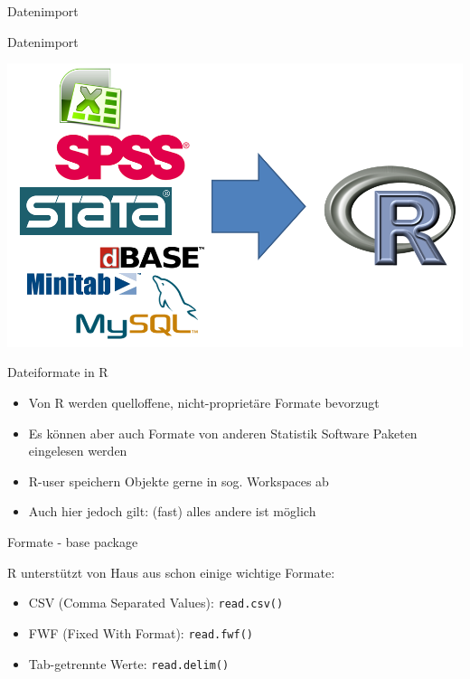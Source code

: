 \documentclass[ignorenonframetext,]{beamer}
\providecommand{\tightlist}{%
\setlength{\itemsep}{0pt}\setlength{\parskip}{0pt}}
\begin{document}
\begin{frame}{Datenimport}

\end{frame}

\begin{frame}{Datenimport}

\includegraphics{./tex2pdf.956/c6299486de2fc9d0f47deb7c7690d9756466e12d.png}

\end{frame}

\begin{frame}{Dateiformate in R}

\begin{itemize}
\tightlist
\item
  Von R werden quelloffene, nicht-proprietäre Formate bevorzugt
\item
  Es können aber auch Formate von anderen Statistik Software Paketen
  eingelesen werden
\item
  R-user speichern Objekte gerne in sog. Workspaces ab
\item
  Auch hier jedoch gilt: (fast) alles andere ist möglich
\end{itemize}

\end{frame}

\begin{frame}[fragile]{Formate - base package}

R unterstützt von Haus aus schon einige wichtige Formate:

\begin{itemize}
\tightlist
\item
  CSV (Comma Separated Values): \texttt{read.csv()}
\item
  FWF (Fixed With Format): \texttt{read.fwf()}
\item
  Tab-getrennte Werte: \texttt{read.delim()}
\end{itemize}

\end{frame}
\end{document}
